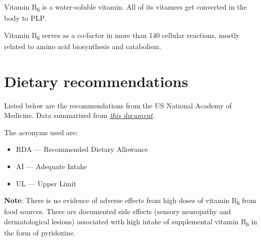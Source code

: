 \documentclass{book}
\begin{document}
\begin{sloppypar}
Vitamin B\textsubscript{6} is a water-soluble vitamin. All of its vitamers get converted in the body to PLP.

Vitamin B\textsubscript{6} serves as a co-factor in more than 140 cellular reactions, mostly related to amino acid biosynthesis and catabolism.

\section{Dietary recommendations}
Listed below are the recommendations from the US National Academy of Medicine. Data summarized from \href{https://nap.nationalacademies.org/read/6015/chapter/9}{\textit{this document}}.

The acronyms used are:
\begin{itemize}
	\item RDA --- Recommended Dietary Allowance
	\item AI --- Adequate Intake
	\item UL --- Upper Limit
\end{itemize}

\textbf{Note}: There is no evidence of adverse effects from high doses of vitamin B\textsubscript{6} from food sources.
There are documented side effects (sensory neuropathy and dermatological lesions) associated with high intake of supplemental vitamin B\textsubscript{6} in the form of pyridoxine.


\end{sloppypar}
\end{document}

